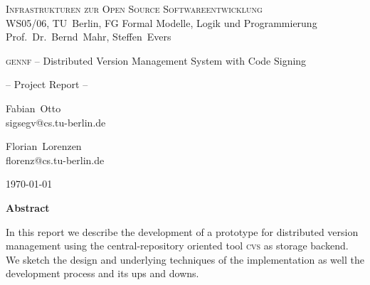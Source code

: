 \documentclass[fleqn, 10pt, a4paper]{report} \usepackage{amssymb}
\newcommand{\GENNF}{\textsc{gennf}}
\begin{document}
\thispagestyle{empty}


\begin{center}
  {\scshape Infrastrukturen zur Open Source Softwareentwicklung} \\
  WS05/06, TU~Berlin, FG Formal Modelle, Logik und
  Programmierung \\
  Prof.~Dr.~Bernd~Mahr, Steffen~Evers \bigskip \bigskip

  {\LARGE \GENNF{} -- Distributed Version Management System with Code
    Signing} \medskip

  {\Large -- Project Report --} \bigskip \bigskip

  {\large
    \begin{minipage}[t]{0.35\linewidth}
      \begin{center}
        Fabian~Otto \\ \vspace{-2mm} {\scriptsize\ttfamily
          sigsegv@cs.tu-berlin.de}
      \end{center}
    \end{minipage}\hspace{8mm}
    \begin{minipage}[t]{0.35\linewidth}
      \begin{center}
        Florian~Lorenzen \\ \vspace{-2mm} {\scriptsize\ttfamily
          florenz@cs.tu-berlin.de}
      \end{center}
    \end{minipage}
    \bigskip \bigskip

    \today}

\end{center}


\begin{center}\textbf{Abstract}\end{center}

\begin{center}
  \parbox{0.85\textwidth}{ In this report we describe the development
    of a prototype for distributed version management using the
    central-repository oriented tool \textsc{cvs} as storage backend.
    We sketch the design and underlying techniques of the
    implementation as well the development process and its ups and
    downs.}
\end{center}
\end{document}
